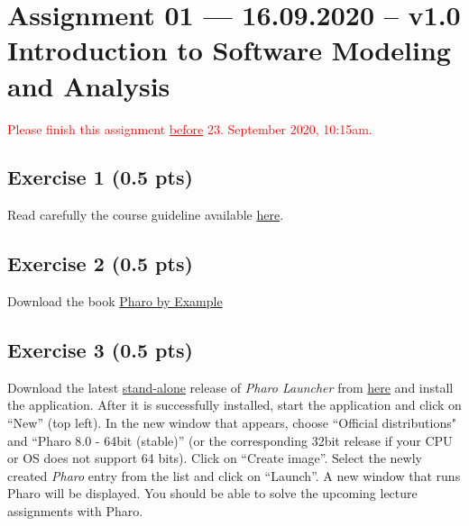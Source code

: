 \documentclass [11pt, a4wide, twoside]{article}
\begin{document}
\section*{Assignment 01  --- 16.09.2020 -- v1.0\\Introduction to Software Modeling and Analysis}

\textcolor{red}{Please finish this assignment \underline{before} 23. September 2020, 10:15am.}\\

\subsection*{Exercise 1 (0.5 pts)}
Read carefully the course guideline available \href{http://scg.unibe.ch/download/lectures/sma-exercises/SMA-RulesForExercises.pdf}{here}.

\subsection*{Exercise 2 (0.5 pts)}
Download the book \href{https://ci.inria.fr/pharo-contribution/view/Books/job/UpdatedPharoByExample/lastSuccessfulBuild/artifact/book-result/UpdatedPharoByExample.pdf}{Pharo by Example}

\subsection*{Exercise 3 (0.5 pts)}
Download the latest \underline{stand-alone} release of \emph{Pharo Launcher} from \href{https://pharo.org/download}{here} and install the application. After it is successfully installed, start the application and click on ``New'' (top left). In the new window that appears, choose ``Official distributions" and ``Pharo 8.0 - 64bit (stable)'' (or the corresponding 32bit release if your CPU or OS does not support 64 bits). Click on ``Create image''. Select the newly created \emph{Pharo} entry from the list and click on ``Launch''. A new window that runs Pharo will be displayed. You should be able to solve the upcoming lecture assignments with Pharo.
\end{document}

